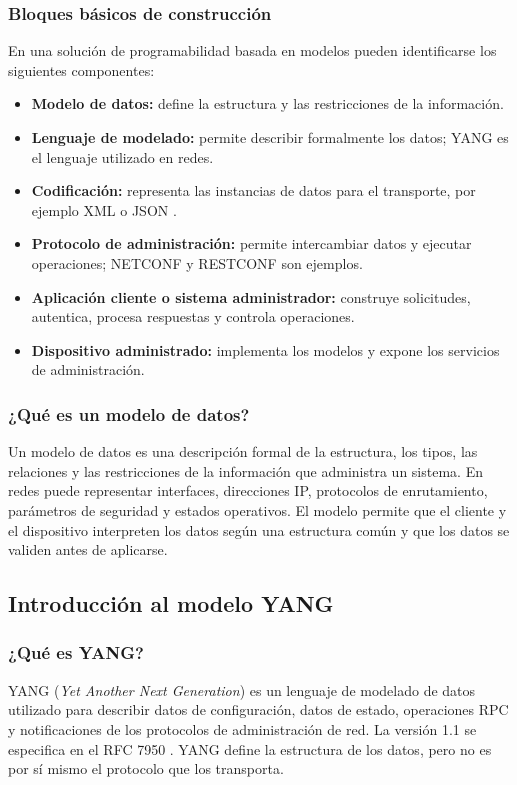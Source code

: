 \subsubsection{Bloques básicos de construcción}
En una solución de programabilidad basada en modelos pueden identificarse los siguientes componentes:
\begin{itemize}
  \item \textbf{Modelo de datos:} define la estructura y las restricciones de la información.
  \item \textbf{Lenguaje de modelado:} permite describir formalmente los datos; YANG es el lenguaje utilizado en redes.
  \item \textbf{Codificación:} representa las instancias de datos para el transporte, por ejemplo XML o JSON \parencite{rfc7951}.
  \item \textbf{Protocolo de administración:} permite intercambiar datos y ejecutar operaciones; NETCONF y RESTCONF son ejemplos.
  \item \textbf{Aplicación cliente o sistema administrador:} construye solicitudes, autentica, procesa respuestas y controla operaciones.
  \item \textbf{Dispositivo administrado:} implementa los modelos y expone los servicios de administración.
\end{itemize}

\subsubsection{¿Qué es un modelo de datos?}
Un modelo de datos es una descripción formal de la estructura, los tipos, las relaciones y las restricciones de la información que administra un sistema. En redes puede representar interfaces, direcciones IP, protocolos de enrutamiento, parámetros de seguridad y estados operativos. El modelo permite que el cliente y el dispositivo interpreten los datos según una estructura común y que los datos se validen antes de aplicarse.

\subsection{Introducción al modelo YANG}

\subsubsection{¿Qué es YANG?}
YANG (\textit{Yet Another Next Generation}) es un lenguaje de modelado de datos utilizado para describir datos de configuración, datos de estado, operaciones RPC y notificaciones de los protocolos de administración de red. La versión 1.1 se especifica en el RFC 7950 \parencite{rfc7950}. YANG define la estructura de los datos, pero no es por sí mismo el protocolo que los transporta.

